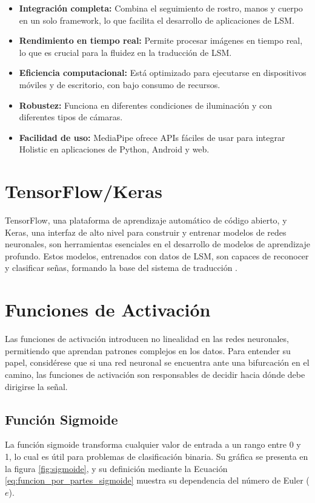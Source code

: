 \begin{itemize}
    \item \textbf{Integración completa:} Combina el seguimiento de rostro, manos y cuerpo en un solo framework, lo que facilita el desarrollo de aplicaciones de LSM.
    \item \textbf{Rendimiento en tiempo real:} Permite procesar imágenes en tiempo real, lo que es crucial para la fluidez en la traducción de LSM.
    \item \textbf{Eficiencia computacional:} Está optimizado para ejecutarse en dispositivos móviles y de escritorio, con bajo consumo de recursos.
    \item \textbf{Robustez:} Funciona en diferentes condiciones de iluminación y con diferentes tipos de cámaras.
    \item \textbf{Facilidad de uso:} MediaPipe ofrece APIs fáciles de usar para integrar Holistic en aplicaciones de Python, Android y web.
\end{itemize}

\section{TensorFlow/Keras}
TensorFlow, una plataforma de aprendizaje automático de código abierto, y Keras, una interfaz de alto nivel para construir y entrenar modelos de redes neuronales, son herramientas esenciales en el desarrollo de modelos de aprendizaje profundo. Estos modelos, entrenados con datos de LSM, son capaces de reconocer y clasificar señas, formando la base del sistema de traducción \cite{ref34}.

\section{Funciones de Activación}
Las funciones de activación introducen no linealidad en las redes neuronales, permitiendo que  aprendan patrones complejos en los datos. Para entender su papel, considérese que si una red neuronal se encuentra ante una bifurcación en el camino, las funciones de activación son responsables de decidir hacia dónde debe dirigirse la señal.


\subsection{Función Sigmoide}
La función sigmoide transforma cualquier valor de entrada a un rango entre 0 y 1, lo cual es útil para problemas de clasificación binaria. Su gráfica se presenta en la figura \ref{fig:sigmoide}, y su definición mediante la Ecuación \ref{eq:funcion_por_partes_sigmoide} muestra su dependencia del número de Euler ($e$).

